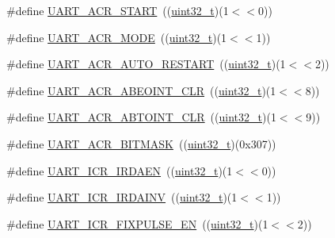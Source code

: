 \begin{DoxyCompactItemize}
\item 
\#define \hyperlink{group___u_a_r_t___private___macros_gaf6a6a4cb65edff2871ba48d3f2b445dc}{U\+A\+R\+T\+\_\+\+A\+C\+R\+\_\+\+S\+T\+A\+RT}~((\hyperlink{_p_e___types_8h_a33594304e786b158f3fb30289278f5af}{uint32\+\_\+t})(1$<$$<$0))
\item 
\#define \hyperlink{group___u_a_r_t___private___macros_ga706e927ee7abf7027eb88b1e13dd2a92}{U\+A\+R\+T\+\_\+\+A\+C\+R\+\_\+\+M\+O\+DE}~((\hyperlink{_p_e___types_8h_a33594304e786b158f3fb30289278f5af}{uint32\+\_\+t})(1$<$$<$1))
\item 
\#define \hyperlink{group___u_a_r_t___private___macros_ga20674ae8e687d2161ef3fd88f2649036}{U\+A\+R\+T\+\_\+\+A\+C\+R\+\_\+\+A\+U\+T\+O\+\_\+\+R\+E\+S\+T\+A\+RT}~((\hyperlink{_p_e___types_8h_a33594304e786b158f3fb30289278f5af}{uint32\+\_\+t})(1$<$$<$2))
\item 
\#define \hyperlink{group___u_a_r_t___private___macros_ga77450ebf0f86b6b7ea363927f0cd40c2}{U\+A\+R\+T\+\_\+\+A\+C\+R\+\_\+\+A\+B\+E\+O\+I\+N\+T\+\_\+\+C\+LR}~((\hyperlink{_p_e___types_8h_a33594304e786b158f3fb30289278f5af}{uint32\+\_\+t})(1$<$$<$8))
\item 
\#define \hyperlink{group___u_a_r_t___private___macros_ga2e12222f359d7a5a41668cd729b0731d}{U\+A\+R\+T\+\_\+\+A\+C\+R\+\_\+\+A\+B\+T\+O\+I\+N\+T\+\_\+\+C\+LR}~((\hyperlink{_p_e___types_8h_a33594304e786b158f3fb30289278f5af}{uint32\+\_\+t})(1$<$$<$9))
\item 
\#define \hyperlink{group___u_a_r_t___private___macros_gae83190d58b42771ee951dfe88aada715}{U\+A\+R\+T\+\_\+\+A\+C\+R\+\_\+\+B\+I\+T\+M\+A\+SK}~((\hyperlink{_p_e___types_8h_a33594304e786b158f3fb30289278f5af}{uint32\+\_\+t})(0x307))
\item 
\#define \hyperlink{group___u_a_r_t___private___macros_ga716e4830450b44e4f290e6c99879ba99}{U\+A\+R\+T\+\_\+\+I\+C\+R\+\_\+\+I\+R\+D\+A\+EN}~((\hyperlink{_p_e___types_8h_a33594304e786b158f3fb30289278f5af}{uint32\+\_\+t})(1$<$$<$0))
\item 
\#define \hyperlink{group___u_a_r_t___private___macros_gabee5ba619dd3c8f28a7d2ec488614f06}{U\+A\+R\+T\+\_\+\+I\+C\+R\+\_\+\+I\+R\+D\+A\+I\+NV}~((\hyperlink{_p_e___types_8h_a33594304e786b158f3fb30289278f5af}{uint32\+\_\+t})(1$<$$<$1))
\item 
\#define \hyperlink{group___u_a_r_t___private___macros_gae022dc3e5ad94f95d2805294d97594cd}{U\+A\+R\+T\+\_\+\+I\+C\+R\+\_\+\+F\+I\+X\+P\+U\+L\+S\+E\+\_\+\+EN}~((\hyperlink{_p_e___types_8h_a33594304e786b158f3fb30289278f5af}{uint32\+\_\+t})(1$<$$<$2))
\item 

\end{DoxyCompactItemize}
